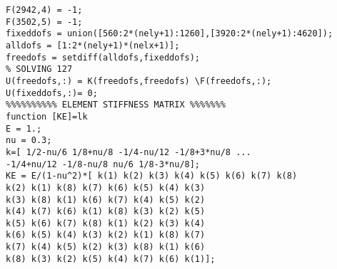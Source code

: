 \documentclass{article}
\begin{document}
\begin{verbatim}
F(2942,4) = -1;
F(3502,5) = -1;
fixeddofs = union([560:2*(nely+1):1260],[3920:2*(nely+1):4620]);
alldofs = [1:2*(nely+1)*(nelx+1)];
freedofs = setdiff(alldofs,fixeddofs);
% SOLVING 127
U(freedofs,:) = K(freedofs,freedofs) \F(freedofs,:);
U(fixeddofs,:)= 0;
%%%%%%%%%% ELEMENT STIFFNESS MATRIX %%%%%%%
function [KE]=lk
E = 1.;
nu = 0.3;
k=[ 1/2-nu/6 1/8+nu/8 -1/4-nu/12 -1/8+3*nu/8 ...
-1/4+nu/12 -1/8-nu/8 nu/6 1/8-3*nu/8];
KE = E/(1-nu^2)*[ k(1) k(2) k(3) k(4) k(5) k(6) k(7) k(8)
k(2) k(1) k(8) k(7) k(6) k(5) k(4) k(3)
k(3) k(8) k(1) k(6) k(7) k(4) k(5) k(2)
k(4) k(7) k(6) k(1) k(8) k(3) k(2) k(5)
k(5) k(6) k(7) k(8) k(1) k(2) k(3) k(4)
k(6) k(5) k(4) k(3) k(2) k(1) k(8) k(7)
k(7) k(4) k(5) k(2) k(3) k(8) k(1) k(6)
k(8) k(3) k(2) k(5) k(4) k(7) k(6) k(1)];

\end{verbatim}
\end{document}
